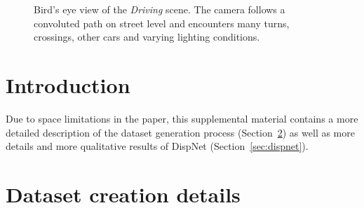 \documentclass[10pt,twocolumn,letterpaper]{article}
\begin{document}

\pagebreak



\setcounter{section}{0}
\setcounter{figure}{0}
\setcounter{footnote}{0}


\begin{figure}%
  \begin{center}%
  {%
  }%
  \end{center}%
  \caption{Bird's eye view of the \emph{Driving} scene. 
           The camera follows a convoluted path on street level and encounters many turns, crossings, other cars and varying lighting conditions.
          }
  \label{fig:fakekitti_birdseye}%
\end{figure}%


\section{Introduction}%

Due to space limitations in the paper, this supplemental material contains a more detailed description of the dataset generation process (Section~\ref{sec:datageneration}) as well as more details and more qualitative results of DispNet (Section~\ref{sec:dispnet}).


\section{Dataset creation details}\label{sec:datageneration}%
\end{document}
